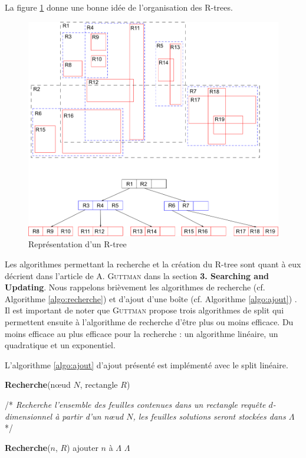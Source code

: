 La figure \ref{fig:rtree} donne une bonne idée de l'organisation des R-trees.
\begin{figure}[htbp]
\centering
\includegraphics[scale=0.50]{img/rtree}
\caption{Représentation d'un R-tree\cite{wiki}}
\label{fig:rtree}
\end{figure}

Les algorithmes permettant la recherche et la création du R-tree sont quant à eux décrient dans l'article de \textsc{A. Guttman} dans la section \textbf{3. Searching and Updating}\cite{Guttman}. Nous rappelons brièvement les algorithmes de recherche (cf. Algorithme \ref{algo:recherche}) et d'ajout d'une boîte (cf. Algorithme \ref{algo:ajout}) \cite{poulos}. Il est important de noter que \textsc{Guttman} propose trois algorithmes de \og split \fg{} qui permettent ensuite à l'algorithme de recherche d'être plus  ou moins efficace. Du moins efficace au plus efficace pour la recherche : un algorithme linéaire, un quadratique et un exponentiel.

L'algorithme \ref{algo:ajout} d'ajout présenté est implémenté avec le split linéaire.

\begin{algorithm}
\caption{\textbf{Recherche}(nœud $N$, rectangle $R$)}
/* \textit{Recherche l'ensemble des feuilles contenues dans un rectangle requête $d$-dimensionnel à partir d'un nœud $N$, les feuilles solutions seront stockées dans $\Lambda$} */
\label{algo:recherche}
\begin{algorithmic}[1]
    \STATE \textbf{Recherche}($n$, $R$)
  \ENDFOR
{}%
    \STATE ajouter $n$ à $\Lambda$
  \ENDFOR
\ENDIF
\RETURN $\Lambda$
\end{algorithmic}
\end{algorithm}

